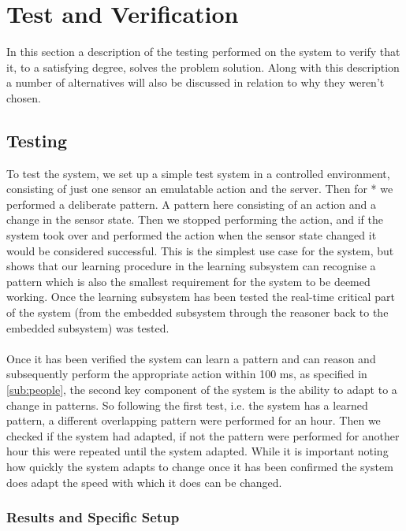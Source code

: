 \chapter{Test and Verification}
In this section a description of the testing performed on the system to verify that it, to a satisfying degree, solves the problem solution. Along with this description a number of alternatives will also be discussed in relation to why they weren't chosen.

\section{Testing}
To test the system, we set up a simple test system in a controlled environment, consisting of just one sensor an emulatable action and the server. Then for * we performed a deliberate pattern. A pattern here consisting of an action and a change in the sensor state. Then we stopped performing the action, and if the system took over and performed the action when the sensor state changed it would be considered successful. This is the simplest use case for the system, but shows that our learning procedure in the learning subsystem can recognise a pattern which is also the smallest requirement for the system to be deemed working. Once the learning subsystem has been tested the real-time critical part of the system (from the embedded subsystem through the reasoner back to the embedded subsystem) was tested.
\\\\
Once it has been verified the system can learn a pattern and can reason and subsequently perform the appropriate action within 100 ms, as specified in \cref{sub:people}, the second key component of the system is the ability to adapt to a change in patterns. So following the first test, i.e. the system has a learned pattern, a different overlapping pattern were performed for an hour. Then we checked if the system had adapted, if not the pattern were performed for another hour this were repeated until the system adapted. While it is important noting how quickly the system adapts to change once it has been confirmed the system does adapt the speed with which it does can be changed.
\subsection{Results and Specific Setup}
%

